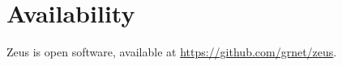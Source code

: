 \documentclass[letterpaper,10pt]{article}
\begin{document}


\section{Availability}

Zeus is open software, available at \url{https://github.com/grnet/zeus}.

{\footnotesize


}
\end{document}
